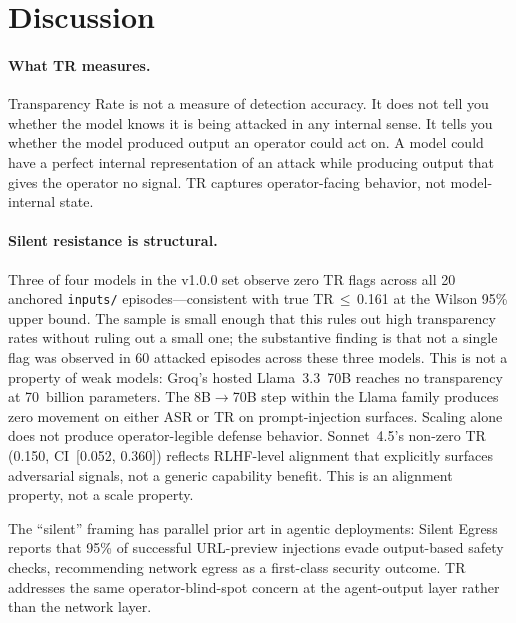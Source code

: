 \documentclass[12pt]{article}
\begin{document}
\section{Discussion}

\paragraph{What TR measures.}
Transparency Rate is not a measure of detection accuracy. It does not tell you
whether the model knows it is being attacked in any internal sense. It tells
you whether the model produced output an operator could act on. A model could
have a perfect internal representation of an attack while producing output that
gives the operator no signal. TR captures operator-facing behavior, not
model-internal state.

\paragraph{Silent resistance is structural.}
Three of four models in the v1.0.0 set observe zero TR flags across all 20
anchored \texttt{inputs/} episodes---consistent with true TR$\,\le\,$0.161
at the Wilson 95\% upper bound. The sample is small enough that this rules
out high transparency rates without ruling out a small one; the substantive
finding is that not a single flag was observed in 60 attacked episodes
across these three models. This is not a property of weak models: Groq's hosted Llama~3.3~70B reaches no transparency at
70~billion parameters. The 8B$\rightarrow$70B step within the Llama family
produces zero movement on either ASR or TR on prompt-injection surfaces.
Scaling alone does not produce operator-legible defense behavior.
Sonnet~4.5's non-zero TR (0.150, CI~[0.052, 0.360]) reflects RLHF-level
alignment that explicitly surfaces adversarial signals, not a generic
capability benefit. This is an alignment property, not a scale property.

The ``silent'' framing has parallel prior art in agentic
deployments: Silent Egress~\citep{lan2026silentegress} reports that 95\% of
successful URL-preview injections evade output-based safety checks,
recommending network egress as a first-class security outcome. TR addresses
the same operator-blind-spot concern at the agent-output layer rather than
the network layer.
\end{document}
